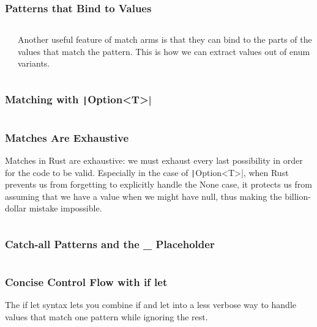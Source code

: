 \documentclass{beamer}
\begin{document}
\begin{frame}[fragile]
	\frametitle{Patterns that Bind to Values}
	\begin{columns}
		\inputminted[fontsize=\scriptsize]{rust}{./code/match2.rs}
		Another useful feature of match arms is that they can bind to the parts of the values that match the pattern. This is how we can extract values out of enum variants.
\end{columns}
\end{frame}

\begin{frame}[fragile]
	\frametitle{Matching with \texttt|Option<T>| }
	\inputminted{rust}{./code/match3.rs}
\end{frame}

\begin{frame}[fragile]
	\frametitle{Matches Are Exhaustive }
	Matches in Rust are exhaustive: we must exhaust every last possibility in order for the code to be valid. Especially in the case of \texttt|Option<T>|, when Rust prevents us from forgetting to explicitly handle the None case, it protects us from assuming that we have a value when we might have null, thus making the billion-dollar mistake impossible.
	\inputminted{rust}{./code/match4.rs}
\end{frame}


\begin{frame}[fragile]
	\frametitle{Catch-all Patterns and the \_ Placeholder}
	\inputminted{rust}{./code/match5.rs}
\end{frame}


\begin{frame}[fragile]
	\frametitle{Concise Control Flow with if let}
	The if let syntax lets you combine if and let into a less verbose way to handle values that match one pattern while ignoring the rest.
	\inputminted{rust}{./code/match6.rs}
\end{frame}
\end{document}

